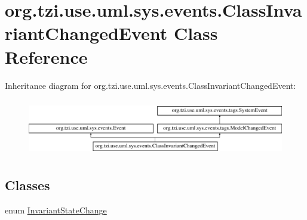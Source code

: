 \hypertarget{classorg_1_1tzi_1_1use_1_1uml_1_1sys_1_1events_1_1_class_invariant_changed_event}{\section{org.\-tzi.\-use.\-uml.\-sys.\-events.\-Class\-Invariant\-Changed\-Event Class Reference}
\label{classorg_1_1tzi_1_1use_1_1uml_1_1sys_1_1events_1_1_class_invariant_changed_event}
}
Inheritance diagram for org.\-tzi.\-use.\-uml.\-sys.\-events.\-Class\-Invariant\-Changed\-Event\-:\begin{figure}[H]
\begin{center}
\leavevmode
\includegraphics[height=2.522523cm]{classorg_1_1tzi_1_1use_1_1uml_1_1sys_1_1events_1_1_class_invariant_changed_event}
\end{center}
\end{figure}
\subsection*{Classes}
\begin{DoxyCompactItemize}
\item 
enum \hyperlink{enumorg_1_1tzi_1_1use_1_1uml_1_1sys_1_1events_1_1_class_invariant_changed_event_1_1_invariant_state_change}{Invariant\-State\-Change}
\end{DoxyCompactItemize}
